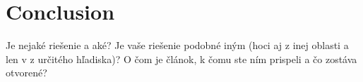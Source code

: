 \documentclass[11pt ,english,a4paper]{article}
\begin{document}
\section{Conclusion}\label{conclusion}

Je nejaké riešenie a aké?
Je vaše riešenie podobné iným (hoci aj z inej oblasti a len v z určitého hľadiska)?
O čom je článok, k čomu ste ním prispeli a čo zostáva otvorené?


\newpage

\end{document}

